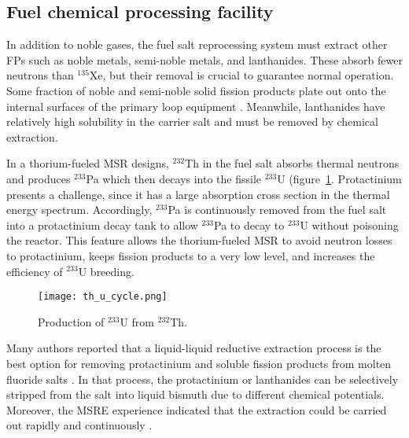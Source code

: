 \subsection{Fuel chemical processing facility} \label{sec:chemical_processing}
In addition to noble gases, the fuel salt reprocessing system must extract 
other \glspl{FP} such as noble metals, semi-noble metals, and lanthanides. These
absorb fewer neutrons than 
$^{135}$Xe, but their removal is crucial to guarantee normal operation. Some 
fraction of noble and semi-noble solid fission products plate out onto the 
internal surfaces of the primary loop equipment  
\cite{briggs_molten-salt_1964}. Meanwhile, lanthanides have relatively high 
solubility in the carrier salt and must be removed by chemical extraction. 

In a thorium-fueled \gls{MSR} designs, $^{232}$Th in the fuel salt absorbs 
thermal neutrons and produces $^{233}$Pa which then decays into the fissile 
$^{233}$U (figure~\ref{fig:th_u_reaction}. Protactinium presents a challenge, 
since it has a large absorption cross section in the thermal energy spectrum. 
Accordingly, $^{233}$Pa is continuously removed from the fuel salt into a 
protactinium decay tank to allow $^{233}$Pa to decay to $^{233}$U without 
poisoning the reactor. This feature allows the thorium-fueled \gls{MSR} to 
avoid neutron losses to protactinium, keeps fission products to a very low 
level, and increases the efficiency of $^{233}$U breeding. 
\begin{figure}[htp!] %
	\centering
	\texttt{[image: th\_u\_cycle.png]}
	\caption{Production of $^{233}$U from $^{232}$Th.}
	\label{fig:th_u_reaction}
\end{figure}

Many authors reported that a liquid-liquid reductive extraction process is the 
best option for removing protactinium and soluble fission products from 
molten fluoride salts \cite{briggs_molten-salt_1969, delpech_molten_2010, 
doligez_coupled_2014}. In that process, the protactinium or lanthanides can be 
selectively stripped from the salt into liquid bismuth due to different 
chemical potentials. Moreover, the \gls{MSRE} experience indicated that the 
extraction could be carried out rapidly and continuously  
\cite{whatley_engineering_1970}.

